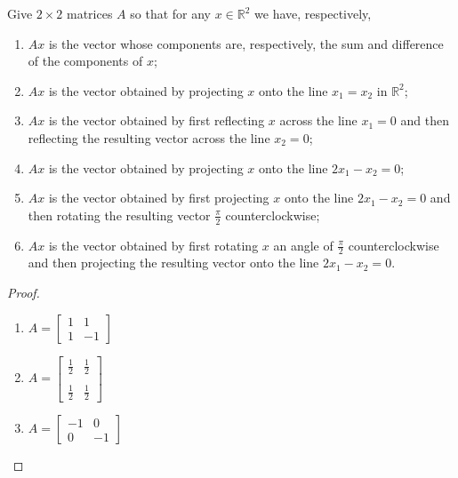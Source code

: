 \begin{exercise} \label{e1.4.5}
    Give \( 2 \times 2 \) matrices \( A \) so that for any \( x \in \mathbb{R}^2 \) we have, respectively,
    \begin{enumerate}
        \item \( Ax \) is the vector whose components are, respectively, the sum and difference of the components of \( x \);
        
        \item \( Ax \) is the vector obtained by projecting \( x \) onto the line \( x_1 = x_2 \) in \( \mathbb{R}^2 \);
        
        \item \( Ax \) is the vector obtained by first reflecting \( x \) across the line \( x_1 = 0 \) and then reflecting the resulting vector across the line \( x_2 = 0 \);
        
        \item \( Ax \) is the vector obtained by projecting \( x \) onto the line \( 2x_1-x_2=0\);
        
        \item \( Ax \) is the vector obtained by first projecting \( x \) onto the line \( 2x_1-x_2=0 \) and then rotating the resulting vector \( \frac{\pi}{2} \) counterclockwise;
        
        \item \( Ax \) is the vector obtained by first rotating \( x \) an angle of \( \frac{\pi}{2} \) counterclockwise and then projecting the resulting vector onto the line \( 2x_1-x_2=0 \).
    \end{enumerate}
    
    \begin{proof}
        \begin{enumerate}
            \item \( A = \begin{bmatrix} 1 & 1 \\ 1 & -1 \end{bmatrix} \)
            
            \item \( A = \begin{bmatrix} \frac{1}{2} & \frac{1}{2} \\ & \\ \frac{1}{2} & \frac{1}{2} \end{bmatrix} \)
            
            \item \( A = \begin{bmatrix} -1 & 0 \\ 0 & -1 \end{bmatrix} \)
            

\end{enumerate}
\end{proof}
\end{exercise}
